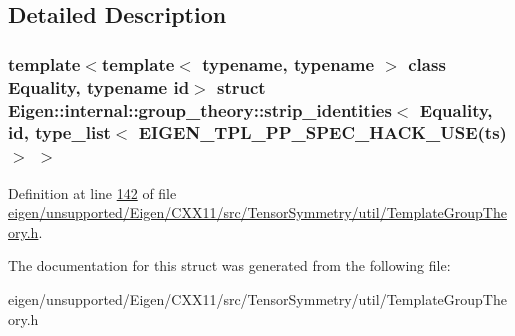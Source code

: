 \subsection{Detailed Description}
\subsubsection*{template$<$template$<$ typename, typename $>$ class Equality, typename id$>$\newline
struct Eigen\+::internal\+::group\+\_\+theory\+::strip\+\_\+identities$<$ Equality, id, type\+\_\+list$<$ E\+I\+G\+E\+N\+\_\+\+T\+P\+L\+\_\+\+P\+P\+\_\+\+S\+P\+E\+C\+\_\+\+H\+A\+C\+K\+\_\+\+U\+S\+E(ts)$>$ $>$}



Definition at line \hyperlink{eigen_2unsupported_2_eigen_2_c_x_x11_2src_2_tensor_symmetry_2util_2_template_group_theory_8h_source_l00142}{142} of file \hyperlink{eigen_2unsupported_2_eigen_2_c_x_x11_2src_2_tensor_symmetry_2util_2_template_group_theory_8h_source}{eigen/unsupported/\+Eigen/\+C\+X\+X11/src/\+Tensor\+Symmetry/util/\+Template\+Group\+Theory.\+h}.



The documentation for this struct was generated from the following file\+:\begin{DoxyCompactItemize}
\item 
eigen/unsupported/\+Eigen/\+C\+X\+X11/src/\+Tensor\+Symmetry/util/\+Template\+Group\+Theory.\+h\end{DoxyCompactItemize}
